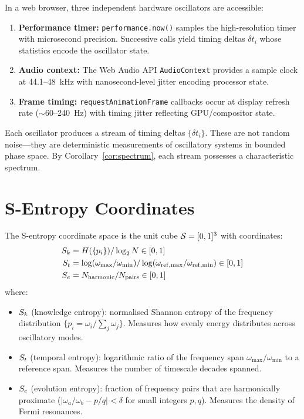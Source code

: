 In a web browser, three independent hardware oscillators are accessible:

\begin{definition}
\label{def:oscillators}
\begin{enumerate}
    \item \textbf{Performance timer:} \texttt{performance.now()} samples the high-resolution timer with microsecond precision. Successive calls yield timing deltas $\delta t_i$ whose statistics encode the oscillator state.
    \item \textbf{Audio context:} The Web Audio API \texttt{AudioContext} provides a sample clock at 44.1--48~kHz with nanosecond-level jitter encoding processor state.
    \item \textbf{Frame timing:} \texttt{requestAnimationFrame} callbacks occur at display refresh rate ($\sim$60--240~Hz) with timing jitter reflecting GPU/compositor state.
\end{enumerate}
\end{definition}

Each oscillator produces a stream of timing deltas $\{\delta t_i\}$. These are not random noise---they are deterministic measurements of oscillatory systems in bounded phase space. By Corollary~\ref{cor:spectrum}, each stream possesses a characteristic spectrum.

\section{S-Entropy Coordinates}
\label{sec:s_coords}

\begin{definition}
\label{def:s_coords}
The S-entropy coordinate space is the unit cube $\mathcal{S} = [0,1]^3$ with coordinates:
\begin{align}
    S_k &= H(\{p_i\}) / \log_2 N \in [0,1] \label{eq:sk} \\
    S_t &= \log(\omega_{\max}/\omega_{\min}) / \log(\omega_{\mathrm{ref,max}}/\omega_{\mathrm{ref,min}}) \in [0,1] \label{eq:st} \\
    S_e &= N_{\mathrm{harmonic}} / N_{\mathrm{pairs}} \in [0,1] \label{eq:se}
\end{align}
where:
\begin{itemize}
    \item $S_k$ (knowledge entropy): normalised Shannon entropy of the frequency distribution $\{p_i = \omega_i / \sum_j \omega_j\}$. Measures how evenly energy distributes across oscillatory modes.
    \item $S_t$ (temporal entropy): logarithmic ratio of the frequency span $\omega_{\max}/\omega_{\min}$ to a reference span. Measures the number of timescale decades spanned.
    \item $S_e$ (evolution entropy): fraction of frequency pairs that are harmonically proximate ($|\omega_a/\omega_b - p/q| < \delta$ for small integers $p, q$). Measures the density of Fermi resonances.
\end{itemize}
\end{definition}

